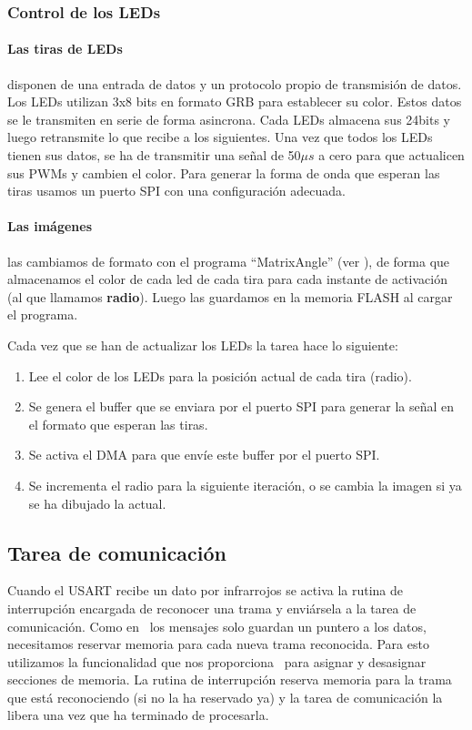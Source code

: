 \subsubsection{Control de los LEDs}
\paragraph{Las tiras de LEDs} disponen de una entrada de datos y un protocolo
propio de transmisión de datos. Los LEDs utilizan 3x8 bits en formato GRB para
establecer su color. Estos datos se le transmiten en serie de forma asincrona.
Cada LEDs almacena sus 24bits y luego retransmite lo que recibe a los
siguientes. Una vez que todos los LEDs tienen sus datos, se ha de transmitir una
señal de 50$\mu s$ a cero para que actualicen sus PWMs y cambien el color. Para
generar la forma de onda que esperan las tiras usamos un puerto SPI con una
configuración adecuada.

\paragraph{Las imágenes} las cambiamos de formato con el programa
``MatrixAngle'' (ver ), de forma que almacenamos el
color de cada led de cada tira para cada instante de activación (al que llamamos
\textbf{radio}). Luego las guardamos en la memoria FLASH al cargar el programa.

Cada vez que se han de actualizar los LEDs la tarea hace lo siguiente:

\begin{enumerate}
	\item Lee el color de los LEDs para la posición actual de cada tira
		(radio).
	\item Se genera el buffer que se enviara por el puerto SPI para generar
		la señal en el formato que esperan las tiras.
	\item Se activa el DMA para que envíe este buffer por el puerto SPI.
	\item Se incrementa el radio para la siguiente iteración, o se cambia la
		imagen si ya se ha dibujado la actual.
\end{enumerate}

\subsection{Tarea de comunicación}
Cuando el USART recibe un dato por infrarrojos se activa la rutina de
interrupción encargada de reconocer una trama y enviársela a la tarea de
comunicación. Como en \uCOS\ los mensajes solo guardan un puntero a los datos,
necesitamos reservar memoria para cada nueva trama reconocida. Para esto
utilizamos la funcionalidad que nos proporciona \uCOS\ para asignar y desasignar
secciones de memoria. La rutina de interrupción reserva memoria para la trama
que está reconociendo (si no la ha reservado ya) y la tarea de comunicación la
libera una vez que ha terminado de procesarla.

